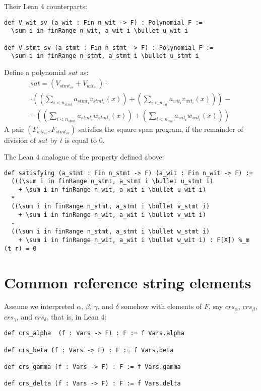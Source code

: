 \documentclass{article}
\theoremstyle{definition}
\theoremstyle{remark}
\begin{document}
Their Lean 4 counterparts:
\begin{lstlisting}
def V_wit_sv (a_wit : Fin n_wit -> F) : Polynomial F :=
  \sum i in finRange n_wit, a_wit i \bullet u_wit i

def V_stmt_sv (a_stmt : Fin n_stmt -> F) : Polynomial F :=
  \sum i in finRange n_stmt, a_stmt i \bullet u_stmt i
\end{lstlisting}


Define a polynomial $sat$ as:
\begin{multline}
sat = (V_{{stmt}_{sv}} + V_{{wit}_{sv}}) \cdot \\ \cdot ((\sum \limits_{i < n_{stmt}} a_{{stmt}_i} v_{{stmt}_i}(x)) + (\sum \limits_{i < n_{wit}} a_{{wit}_i} v_{{wit}_i}(x) )) - \\ - ((\sum \limits_{i < n_{stmt}} a_{{stmt}_i} w_{{stmt}_i}(x)) + (\sum \limits_{i < n_{wit}} a_{{wit}_i} w_{{wit}_i}(x) ))
\end{multline}
A pair $(F_{{wit}_{sv}}, F_{{stmt}_{sv}})$ satisfies the square span program, if the remainder of division of $sat$ by $t$ is equal to $0$.

The Lean 4 analogue of the property defined above:
\begin{lstlisting}
def satisfying (a_stmt : Fin n_stmt -> F) (a_wit : Fin n_wit -> F) :=
  (((\sum i in finRange n_stmt, a_stmt i \bullet u_stmt i)
    + \sum i in finRange n_wit, a_wit i \bullet u_wit i)
  *
  ((\sum i in finRange n_stmt, a_stmt i \bullet v_stmt i)
    + \sum i in finRange n_wit, a_wit i \bullet v_wit i)
  -
  ((\sum i in finRange n_stmt, a_stmt i \bullet w_stmt i)
    + \sum i in finRange n_wit, a_wit i \bullet w_wit i) : F[X]) %_m (t r) = 0
\end{lstlisting}

\section{Common reference string elements}

Assume we interpreted $\alpha$, $\beta$, $\gamma$, and $\delta$ somehow with elements of $F$, say $crs_{\alpha}$, $crs_{\beta}$, $crs_{\gamma}$, and $crs_{\delta}$, that is, in Lean 4:

\begin{lstlisting}
def crs_alpha  (f : Vars -> F) : F := f Vars.alpha

def crs_beta (f : Vars -> F) : F := f Vars.beta

def crs_gamma (f : Vars -> F) : F := f Vars.gamma

def crs_delta (f : Vars -> F) : F := f Vars.delta
\end{lstlisting}
\end{document}
